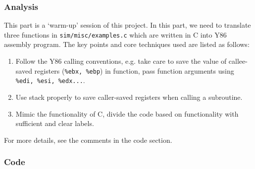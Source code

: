 \documentclass{article}
\begin{document}
\subsubsection{Analysis}

This part is a `warm-up' session of this project. In this part, we need to translate three functions in \verb|sim/misc/examples.c| which are written in C into Y86 assembly program. The key points and core techniques used are listed as follows:

\begin{enumerate}
  \item Follow the Y86 calling conventions, e.g. take care to save the value of callee-saved registers (\verb|%ebx, %ebp|) in function, pass function arguments using \verb|%edi, %esi, %edx...|.
  \item Use stack properly to save caller-saved registers when calling a subroutine.
  \item Mimic the functionality of C, divide the code based on functionality with sufficient and clear labels.
\end{enumerate}

\noindent For more details, see the comments in the code section.

\subsubsection{Code}
\end{document}
